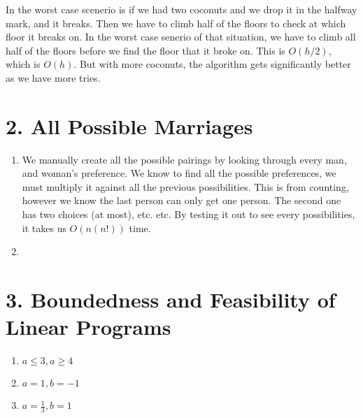 \documentclass[11pt]{article}
\newenvironment{qparts}{\begin{enumerate}[{(}a{)}]}{\end{enumerate}}
\begin{document}
\begin{qparts}
In the worst case scenerio is if we had two coconuts and we drop it in the halfway mark, and it breaks. Then we have to climb half of the floors to check at which floor it breaks on. In the worst case senerio of that situation, we have to climb all half of the floors before we find the floor that it broke on. This is $O(h/2)$, which is $O(h)$. But with more coconuts, the algorithm gets significantly better as we have more tries. 
\end{qparts}

\newpage
\section*{2. All Possible Marriages}
\begin{qparts}
\item We manually create all the possible pairings by looking through every man, and woman's preference. We know to find all the possible preferences, we must multiply it against all the previous possibilities. This is from counting, however we know the last person can only get one person. The second one has two choices (at most), etc. etc. By testing it out to see every possibilities, it takes us $O(n(n!))$ time. 
\item 
\end{qparts}

\newpage
\section*{3. Boundedness and Feasibility of Linear Programs}
\begin{qparts}
	\item $a \leq 3, a \geq 4$
	\item $a = 1, b = -1$
	\item $a = \frac{1}{3}, b = 1$
\end{qparts}

\newpage
\end{document}
